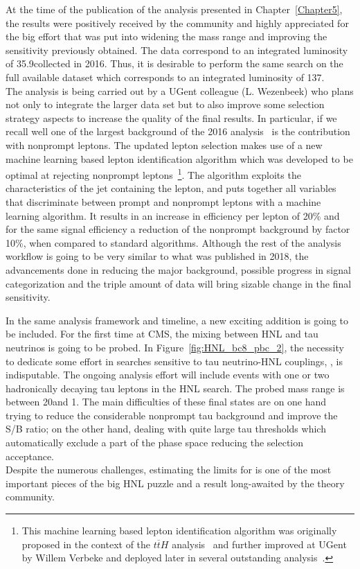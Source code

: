 At the time of the publication of the analysis presented in
Chapter~\ref{Chapter5}, the results were positively received by the community and highly appreciated
for the big effort that was put into widening the mass range and
improving the sensitivity previously obtained. The
data correspond to an integrated luminosity of 
35.9\fbinv collected in 2016. Thus, it is desirable to perform the same
search on the full available dataset which corresponds to an integrated luminosity of 
137\fbinv. \\
The analysis is being carried out by a UGent colleague (L. Wezenbeek)
who plans not only to integrate the larger data set but to also improve
some selection strategy aspects to increase the quality of the final
results. In particular, if we recall well one of the largest
background of the 2016 analysis~\cite{Sirunyan:2018mtv} is the contribution with nonprompt
leptons. The updated lepton selection makes use of a new machine learning
based lepton identification algorithm which was developed to be
optimal at rejecting nonprompt leptons~\footnote{This machine learning
based lepton identification algorithm was originally proposed in the context of the $t\overline{t}H$ analysis~\cite{Sirunyan_2018_ttH} and further improved at UGent by Willem
Verbeke and deployed later in several outstanding analysis~\cite{CMS:2018sgc_tzq, Sirunyan_2021_higgsmumu}.}. The algorithm exploits the
characteristics of the jet containing the lepton, and puts together all
variables that discriminate between prompt and
nonprompt leptons with a machine learning algorithm. It results in an increase in efficiency
per lepton of 20\% and for the same signal
efficiency a reduction of the
nonprompt background
by factor 10\%, when compared to standard algorithms. Although the rest of the analysis workflow is going to be very
similar to what was published in 2018, the advancements done in reducing the
major background, possible progress in signal categorization and the
triple amount of data will bring sizable change in the final
sensitivity.

In the same analysis framework and timeline, a new exciting addition
is going to be included. For the first time at CMS, the mixing between
HNL and tau neutrinos is going to be probed.
In Figure~\ref{fig:HNL_bc8_pbc_2}, the necessity to dedicate some effort in searches sensitive to tau neutrino-HNL couplings, \mixpart, is indisputable. The ongoing analysis effort will include events with one or two hadronically decaying tau leptons in the HNL search. The probed mass
range is between 20\GeV and 1\TeV. The main difficulties of these final
states are on one hand trying to reduce the considerable nonprompt tau background and
improve the S/B ratio; on the other hand, dealing with quite large tau
\pt thresholds which automatically exclude a part of the phase space
reducing the selection acceptance. \\
Despite the numerous challenges, estimating the limits for \mixpart is
one of the most important pieces of the big HNL puzzle and a result long-awaited
by the theory community.  


